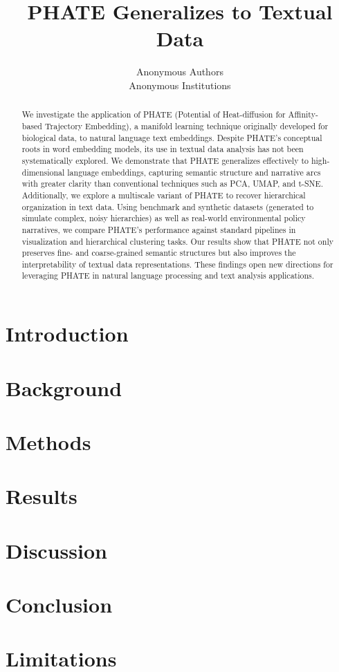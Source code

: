 \documentclass[11pt]{article}
\title{PHATE Generalizes to Textual Data}
\author{Anonymous Authors\\
Anonymous Institutions
}
\begin{document}
\maketitle
\begin{abstract}
We investigate the application of PHATE (Potential of Heat-diffusion for Affinity-based Trajectory Embedding), a manifold learning technique originally developed for biological data, to natural language text embeddings. Despite PHATE’s conceptual roots in word embedding models, its use in textual data analysis has not been systematically explored. We demonstrate that PHATE generalizes effectively to high-dimensional language embeddings, capturing semantic structure and narrative arcs with greater clarity than conventional techniques such as PCA, UMAP, and t-SNE. Additionally, we explore a multiscale variant of PHATE to recover hierarchical organization in text data. Using benchmark and synthetic datasets (generated to simulate complex, noisy hierarchies) as well as real-world environmental policy narratives, we compare PHATE’s performance against standard pipelines in visualization and hierarchical clustering tasks. Our results show that PHATE not only preserves fine- and coarse-grained semantic structures but also improves the interpretability of textual data representations. These findings open new directions for leveraging PHATE in natural language processing and text analysis applications.
\end{abstract}

\section{Introduction}


\section{Background}


\section{Methods}


\section{Results}


\section{Discussion}


\section{Conclusion}


\section{Limitations}





\appendix

\end{document}
